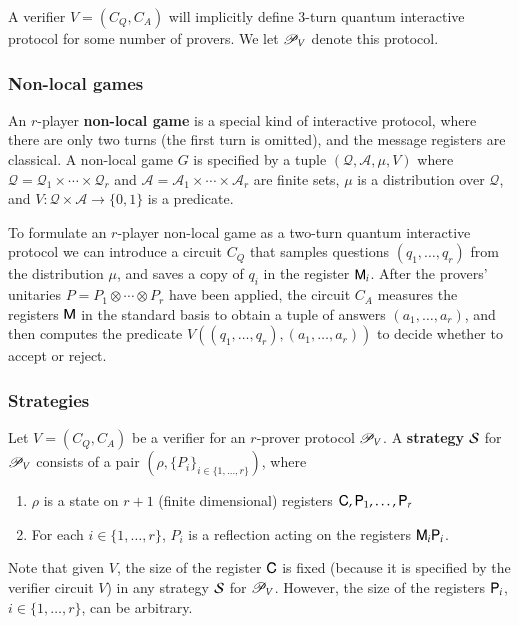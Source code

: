 A verifier $V = (C_Q,C_A)$ will implicitly define $3$-turn quantum interactive protocol for some number of provers. We let $\mathscr{P}_V$ denote this protocol.



\subsubsection{Non-local games} 


An $r$-player \textbf{non-local game} is a special kind of interactive protocol, where there are only two turns (the first turn is omitted), and the message registers are classical. A non-local game $G$ is specified by a tuple $(\mathcal{Q},\mathcal{A},\mu,V)$ where $\mathcal{Q} = \mathcal{Q}_1 \times \cdots \times \mathcal{Q}_r$ and $\mathcal{A} = \mathcal{A}_1 \times \cdots \times \mathcal{A}_r$ are finite sets, $\mu$ is a distribution over $\mathcal{Q}$, and $V: \mathcal{Q} \times \mathcal{A} \to \{0,1\}$ is a predicate. 


To formulate an $r$-player non-local game as a two-turn quantum interactive protocol we can introduce a circuit $C_Q$ that samples questions $(q_1,\ldots,q_r)$ from the distribution $\mu$, and saves a copy of $q_i$ in the register ${\mathsf{M}}_i$. After the provers' unitaries $P = P_1 \otimes \cdots \otimes P_r$ have been applied, the circuit $C_A$ measures the registers ${\mathsf{M}}$  in the standard basis to obtain a tuple of answers $(a_1,\ldots,a_r)$, and then computes the predicate $V((q_1,\ldots,q_r),(a_1,\ldots,a_r))$ to decide whether to accept or reject.


\subsubsection{Strategies}

Let $V = (C_Q,C_A)$ be a verifier for an $r$-prover protocol $\mathscr{P}_V$. A \textbf{strategy} $\mathcal{S}$ for $\mathscr{P}_V$ consists of a pair $(\rho,\{P_i\}_{i\in\{1,\ldots,r\}})$, where
\begin{enumerate}
	\item $\rho$ is a state on $r+1$ (finite dimensional) registers ${\mathsf{C}}, {\mathsf{P}}_1, \ldots, {\mathsf{P}}_r$
	\item For each $i\in\{1,\ldots,r\}$, $P_i$ is a reflection acting on the registers ${\mathsf{M}}_i {\mathsf{P}}_i$.
\end{enumerate}
Note that given $V$, the size of the register ${\mathsf{C}}$ is fixed (because it is specified by the verifier circuit $V$) in any strategy $\mathcal{S}$ for $\mathscr{P}_V$. However, the size of the registers ${\mathsf{P}}_i$, $i\in\{1,\ldots,r\}$, can be arbitrary.

